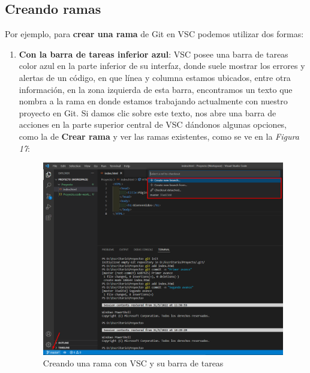 \subsection{Creando ramas}
\hspace{0.55cm}Por ejemplo, para \textbf{crear una rama} de Git en VSC podemos utilizar dos formas:
\begin{enumerate}
    \item \textbf{Con la barra de tareas inferior azul}: VSC posee una barra de tareas color azul en la parte inferior de su interfaz, donde suele mostrar los errores y alertas de un código, en que línea y columna estamos ubicados, entre otra información, en la zona izquierda de esta barra, encontramos un texto que nombra a la rama en donde estamos trabajando actualmente con nuestro proyecto en Git. Si damos clic sobre este texto, nos abre una barra de acciones en la parte superior central de VSC dándonos algunas opciones, como la de \textbf{Crear rama} y ver las ramas existentes, como se ve en la \textit{Figura 17}:
    \begin{figure}[H]
        \begin{center}
            \caption{Creando una rama con VSC y su barra de tareas}
            \label{fig: 17}
            \includegraphics[width=\textwidth]{capturas/creando_b1.png}
        \end{center}
    \end{figure}
    

\end{enumerate}
